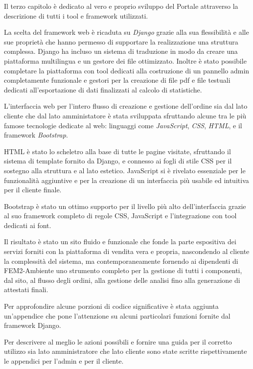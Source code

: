 \documentclass[12pt,a4paper]{scrartcl}
\def \fem {FEM2-Ambiente}
\def \js {JavaScript}
\begin{document}
Il terzo capitolo è dedicato al vero e proprio sviluppo del Portale attraverso la descrizione di tutti i tool e framework utilizzati.

La scelta del framework web è ricaduta su \emph{Django} grazie alla sua flessibilità e alle sue proprietà che hanno permesso di supportare la realizzazione una struttura complessa. Django ha incluso un sistema di traduzione in modo da creare una piattaforma multilingua e un gestore dei file ottimizzato. Inoltre è stato possibile completare la piattaforma con tool dedicati alla costruzione di un pannello admin completamente funzionale e gestori per la creazione di file pdf e file testuali dedicati all'esportazione di dati finalizzati al calcolo di statistiche.

L'interfaccia web per l'intero flusso di creazione e gestione dell'ordine sia dal lato cliente che dal lato amministatore è stata sviluppata sfruttando alcune tra le più famose tecnologie dedicate al web: linguaggi come \emph{{\js}}, \emph{CSS}, \emph{HTML}, e il framework \emph{Bootstrap}.

HTML è stato lo scheletro alla base di tutte le pagine visitate, sfruttando il sistema di template fornito da Django, e connesso ai fogli di stile CSS per il sostegno alla struttura e al lato estetico. {\js} si è rivelato essenziale per le funzionalità aggiuntive e per la creazione di un interfaccia più usabile ed intuitiva per il cliente finale.

Bootstrap è stato un ottimo supporto per il livello più alto dell'interfaccia grazie al suo framework completo di regole CSS, {\js} e l'integrazione con tool dedicati ai font.


Il risultato è stato un sito fluido e funzionale che fonde la parte espositiva dei servizi forniti con la piattaforma di vendita vera e propria, nascondendo al cliente la complessità del sistema, ma contemporaneamente fornendo ai dipendenti di {\fem} uno strumento completo per la gestione di tutti i componenti, dal sito, al flusso degli ordini, alla gestione delle analisi fino alla generazione di attestati finali.

Per approfondire alcune porzioni di codice significative è stata aggiunta un'appendice che pone l'attenzione su alcuni particolari funzioni fornite dal framework Django.

Per descrivere al meglio le azioni possibili e fornire una guida per il corretto utilizzo sia lato amministratore che lato cliente sono state scritte rispettivamente le appendici per l'admin e per il cliente.
\end{document}
